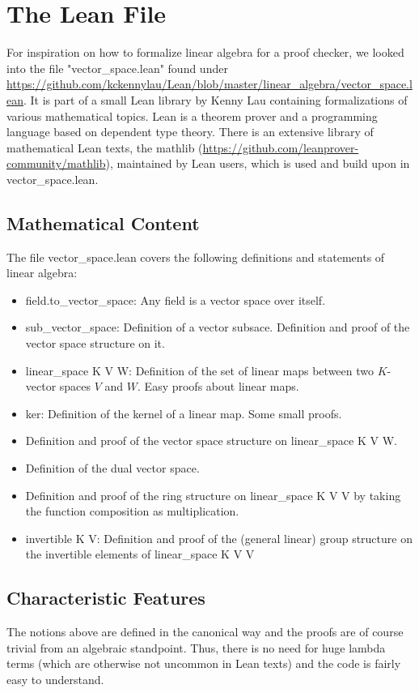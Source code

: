 \documentclass[11pt]{article}
\begin{document}
\newpage
\lstset{style=lean}
\section{The Lean File}
For inspiration on how to formalize linear algebra for a proof checker, we looked into the file "vector\_space.lean" found under \url{https://github.com/kckennylau/Lean/blob/master/linear_algebra/vector_space.lean}. It is part of a small Lean library by Kenny Lau containing formalizations of various mathematical topics.
Lean is a theorem prover and a programming language based on dependent type theory.
There is an extensive library of mathematical Lean texts, the mathlib (\url{https://github.com/leanprover-community/mathlib}), maintained by Lean users, which is used and build upon in vector\_space.lean.



\subsection{Mathematical Content} \label{mathematicalContent}
The file vector\_space.lean covers the following definitions and statements of linear algebra:
\begin{itemize}
\item {\lean field.to\_vector\_space}: Any field is a vector space over itself.
\item {\lean sub\_vector\_space}: Definition of a vector subsace. Definition and proof of the vector space structure on it.
\item {\lean linear\_space K V W}: Definition of the set of linear maps between two $K$-vector spaces $V$ and $W$. Easy proofs about linear maps.
\item {\lean ker}: Definition of the kernel of a linear map. Some small proofs.
\item Definition and proof of the vector space structure on {\lean linear\_space K V W}.
\item Definition of the dual vector space.
\item Definition and proof of the ring structure on {\lean linear\_space K V V} by taking the function composition as multiplication.
\item {\lean invertible K V}: Definition and proof of the (general linear) group structure on the invertible elements of {\lean linear\_space K V V}
\end{itemize}


%
\subsection{Characteristic Features} \label{characteristics}
The notions above are defined in the canonical way and the proofs are of course trivial from an algebraic standpoint. Thus, there is no need for huge lambda terms (which are otherwise not uncommon in Lean texts) and the code is fairly easy to understand.
\end{document}
